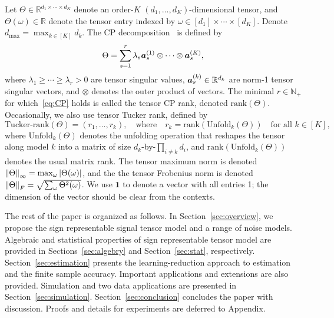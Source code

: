 \documentclass[twoside,11pt]{article}
\theoremstyle{definition}
\begin{document}
Let $\Theta\in\mathbb{R}^{d_1\times \cdots \times d_K}$ denote an order-$K$ $(d_1,\ldots,d_K)$-dimensional tensor, and $\Theta(\omega)\in\mathbb{R}$ denote the tensor entry indexed by $\omega \in[d_1]\times \cdots \times [d_K]$. Denote $d_{\max}=\max_{k\in[K]}d_k$. 
The CP decomposition~\citep{hitchcock1927expression} is defined by
 \begin{equation}\label{eq:CP}
\Theta=\sum_{s=1}^r\lambda_s\bm{a}^{(1)}_s\otimes\cdots\otimes \bm{a}^{(K)}_s,
 \end{equation}
 where $\lambda_1\geq \cdots \geq \lambda_r>0$ are tensor singular values, $\bm{a}^{(k)}_s\in\mathbb{R}^{d_k}$ are norm-1 tensor singular vectors, and $\otimes$ denotes the outer product of vectors. 
 The minimal $r\in\mathbb{N}_{+}$ for which~\eqref{eq:CP} holds is called the tensor CP rank, denoted $\text{rank}(\Theta)$. Occasionally, we also use tensor Tucker rank, defined by
 \[
 \text{Tucker-rank} (\Theta)=(r_1,\ldots,r_k),\quad \text{where}\quad r_k=\text{rank}(\text{Unfold}_k(\Theta))\quad \text{for all }k\in[K], 
 \]
 where $\text{Unfold}_k(\Theta)$ denotes the unfolding operation that reshapes the tensor along model $k$ into a matrix of size $d_k$-by-$\prod_{i\neq k}d_i$, and $\text{rank}(\text{Unfold}_k(\Theta))$ denotes the usual matrix rank. The tensor maximum norm is denoted $\left\lVert\Theta\right\rVert_\infty=\max_{\omega}|\Theta(\omega)|$, and the the tensor Frobenius norm is denoted $\left\lVert\Theta\right\rVert_F=\sqrt{\sum_{\omega}\Theta^2(\omega)}$.  We use $\mathbf{1}$ to denote a vector with all entries 1; the dimension of the vector should be clear from the contexts. 
 
The rest of the paper is organized as follows. In Section~\ref{sec:overview}, we propose the sign representable signal tensor model and a range of noise models. Algebraic and statistical properties of sign representable tensor model are provided in Sections~\ref{sec:algebry} and Section~\ref{sec:stat}, respectively. Section~\ref{sec:estimation} presents the learning-reduction approach to estimation and the finite sample accuracy. Important applications and extensions are also provided. Simulation and two data applications are presented in Section~\ref{sec:simulation}. Section~\ref{sec:conclusion} concludes the paper with discussion. Proofs and details for experiments are deferred to Appendix. 
\end{document}

